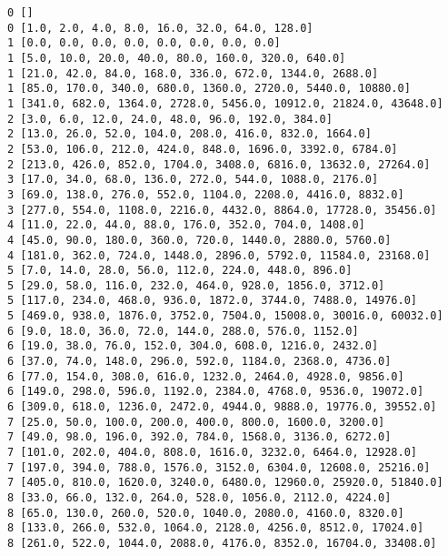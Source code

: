 \documentclass{article}
\begin{document}
\begin{verbatim}
0 []
0 [1.0, 2.0, 4.0, 8.0, 16.0, 32.0, 64.0, 128.0]
1 [0.0, 0.0, 0.0, 0.0, 0.0, 0.0, 0.0, 0.0]
1 [5.0, 10.0, 20.0, 40.0, 80.0, 160.0, 320.0, 640.0]
1 [21.0, 42.0, 84.0, 168.0, 336.0, 672.0, 1344.0, 2688.0]
1 [85.0, 170.0, 340.0, 680.0, 1360.0, 2720.0, 5440.0, 10880.0]
1 [341.0, 682.0, 1364.0, 2728.0, 5456.0, 10912.0, 21824.0, 43648.0]
2 [3.0, 6.0, 12.0, 24.0, 48.0, 96.0, 192.0, 384.0]
2 [13.0, 26.0, 52.0, 104.0, 208.0, 416.0, 832.0, 1664.0]
2 [53.0, 106.0, 212.0, 424.0, 848.0, 1696.0, 3392.0, 6784.0]
2 [213.0, 426.0, 852.0, 1704.0, 3408.0, 6816.0, 13632.0, 27264.0]
3 [17.0, 34.0, 68.0, 136.0, 272.0, 544.0, 1088.0, 2176.0]
3 [69.0, 138.0, 276.0, 552.0, 1104.0, 2208.0, 4416.0, 8832.0]
3 [277.0, 554.0, 1108.0, 2216.0, 4432.0, 8864.0, 17728.0, 35456.0]
4 [11.0, 22.0, 44.0, 88.0, 176.0, 352.0, 704.0, 1408.0]
4 [45.0, 90.0, 180.0, 360.0, 720.0, 1440.0, 2880.0, 5760.0]
4 [181.0, 362.0, 724.0, 1448.0, 2896.0, 5792.0, 11584.0, 23168.0]
5 [7.0, 14.0, 28.0, 56.0, 112.0, 224.0, 448.0, 896.0]
5 [29.0, 58.0, 116.0, 232.0, 464.0, 928.0, 1856.0, 3712.0]
5 [117.0, 234.0, 468.0, 936.0, 1872.0, 3744.0, 7488.0, 14976.0]
5 [469.0, 938.0, 1876.0, 3752.0, 7504.0, 15008.0, 30016.0, 60032.0]
6 [9.0, 18.0, 36.0, 72.0, 144.0, 288.0, 576.0, 1152.0]
6 [19.0, 38.0, 76.0, 152.0, 304.0, 608.0, 1216.0, 2432.0]
6 [37.0, 74.0, 148.0, 296.0, 592.0, 1184.0, 2368.0, 4736.0]
6 [77.0, 154.0, 308.0, 616.0, 1232.0, 2464.0, 4928.0, 9856.0]
6 [149.0, 298.0, 596.0, 1192.0, 2384.0, 4768.0, 9536.0, 19072.0]
6 [309.0, 618.0, 1236.0, 2472.0, 4944.0, 9888.0, 19776.0, 39552.0]
7 [25.0, 50.0, 100.0, 200.0, 400.0, 800.0, 1600.0, 3200.0]
7 [49.0, 98.0, 196.0, 392.0, 784.0, 1568.0, 3136.0, 6272.0]
7 [101.0, 202.0, 404.0, 808.0, 1616.0, 3232.0, 6464.0, 12928.0]
7 [197.0, 394.0, 788.0, 1576.0, 3152.0, 6304.0, 12608.0, 25216.0]
7 [405.0, 810.0, 1620.0, 3240.0, 6480.0, 12960.0, 25920.0, 51840.0]
8 [33.0, 66.0, 132.0, 264.0, 528.0, 1056.0, 2112.0, 4224.0]
8 [65.0, 130.0, 260.0, 520.0, 1040.0, 2080.0, 4160.0, 8320.0]
8 [133.0, 266.0, 532.0, 1064.0, 2128.0, 4256.0, 8512.0, 17024.0]
8 [261.0, 522.0, 1044.0, 2088.0, 4176.0, 8352.0, 16704.0, 33408.0]
\end{verbatim}
\end{document}
